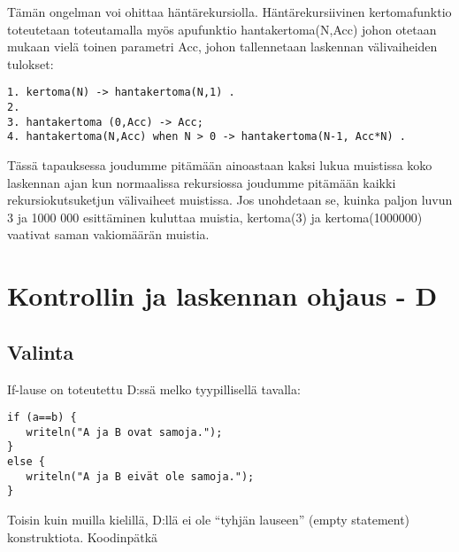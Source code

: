 \documentclass[11pt,oneside,a4paper]{article}
\begin{document}

Tämän ongelman voi ohittaa häntärekursiolla. Häntärekursiivinen kertomafunktio
toteutetaan toteutamalla myös apufunktio hantakertoma(N,Acc) johon otetaan
mukaan vielä toinen parametri Acc, johon tallennetaan laskennan 
välivaiheiden tulokset:
\begin{verbatim}
1. kertoma(N) -> hantakertoma(N,1) .
2.
3. hantakertoma (0,Acc) -> Acc;
4. hantakertoma(N,Acc) when N > 0 -> hantakertoma(N-1, Acc*N) .
\end{verbatim}


Tässä tapauksessa joudumme pitämään ainoastaan kaksi lukua muistissa koko
laskennan ajan kun normaalissa rekursiossa joudumme pitämään kaikki
rekursiokutsuketjun välivaiheet muistissa. Jos unohdetaan se, kuinka paljon
luvun 3 ja 1000 000 esittäminen kuluttaa muistia, kertoma(3) ja kertoma(1000000)
vaativat saman vakiomäärän muistia. 

\section{Kontrollin ja laskennan ohjaus - D}

\subsection{Valinta}

If-lause on toteutettu D:ssä melko tyypillisellä tavalla:

\begin{verbatim}
if (a==b) {
   writeln("A ja B ovat samoja.");
}
else {
   writeln("A ja B eivät ole samoja.");
}
\end{verbatim}
Toisin kuin muilla kielillä, D:llä ei ole ``tyhjän lauseen'' (empty statement)
konstruktiota. Koodinpätkä
\end{document}
